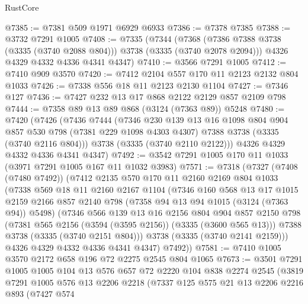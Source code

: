 \begin{lexlean}{RustCore}
\begin{coremodule}
@7385 := @7381 @509 @1971 @6929 @6933
@7386 := @7378 @7385
@7388 := @3732 @7291 @1005
@7408 := @7335
    (@7344
      (@7368 (@7386 @7388 @3738 (@3335 (@3740 @2088 @804))) @3738 (@3335 (@3740 @2078 @2094)))
      @4326
      @4329
      @4332
      @4336
      @4341
      @4347)
@7410 := @3566 @7291 @1005
@7412 := @7410 @909 @3570
@7420 := @7412 @2104 @557 @170 @11 @2123 @2132 @804 @1033
@7426 := @7338 @556 @18 @11 @2123 @2130 @1104
@7427 := @7346 @127
@7436 := @7427 @232 @13 @17 @868 @2122 @2129 @857 @2109 @798
@7444 := @7358 @89 @13 @89 @868 (@3124 (@7363 @89)) @5248
@7480 := @7420
    (@7426
      (@7436
        @7444
        (@7346
          @230
          @139
          @13
          @16
          @1098
          @804
          @904
          @857
          @530
          @798
          (@7381 @229 @1098 @4303 @4307)
          @7388
          @3738
          (@3335 (@3740 @2116 @804)))
        @3738
        (@3335 (@3740 @2110 @2122)))
      @4326
      @4329
      @4332
      @4336
      @4341
      @4347)
@7492 := @3542 @7291 @1005 @170 @11 @1033 (@3971 @7291 @1005 @167 @11 @1032 @3983)
@7571 := @7318
    (@7327
      (@7408 (@7480 @7492))
      (@7412
        @2135
        @570
        @170
        @11
        @2160
        @2169
        @804
        @1033
        (@7338
          @569
          @18
          @11
          @2160
          @2167
          @1104
          (@7346
            @160
            @568
            @13
            @17
            @1015
            @2159
            @2166
            @857
            @2140
            @798
            (@7358 @94 @13 @94 @1015 (@3124 (@7363 @94)) @5498)
            (@7346
              @566
              @139
              @13
              @16
              @2156
              @804
              @904
              @857
              @2150
              @798
              (@7381 @565 @2156 (@3594 (@3595 @2156)) (@3335 (@3600 @565 @13)))
              @7388
              @3738
              (@3335 (@3740 @2151 @804)))
            @3738
            (@3335 (@3740 @2141 @2159)))
          @4326
          @4329
          @4332
          @4336
          @4341
          @4347)
        @7492))
@7581 := @7410 @1005 @3570 @2172 @658 @196 @72 @2275 @2545 @804 @1065
@7673 := @3501
    @7291
    @1005
    @1005
    @104
    @13
    @576
    @657
    @72
    @2220
    @104
    @838
    @2274
    @2545
    (@3819
      @7291
      @1005
      @576
      @13
      @2206
      @2218
      (@7337
        @125
        @575
        @21
        @13
        @2206
        @2216
        @893
        (@7427
          @574

\end{coremodule}
\end{lexlean}
